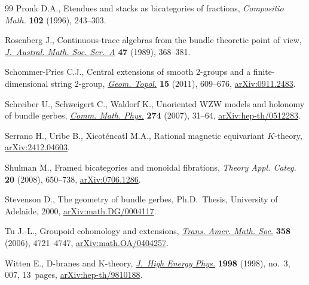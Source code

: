 \documentclass[pdftex]{sigma}
\numberwithin{equation}{section}
\begin{document}
\begin{thebibliography}{99}
Pronk D.A., Etendues and stacks as bicategories of fractions,
 \textit{Compositio Math.} \textbf{102} (1996), 243--303.

Rosenberg J., Continuous-trace algebras from the bundle theoretic point of
 view, \href{https://doi.org/10.1017/S1446788700033097}{\textit{J.~Austral.
 Math. Soc. Ser.~A}} \textbf{47} (1989), 368--381.

Schommer-Pries C.J., Central extensions of smooth 2-groups and a
 finite-dimensional string 2-group,
 \href{https://doi.org/10.2140/gt.2011.15.609}{\textit{Geom. Topol.}}
 \textbf{15} (2011), 609--676,
 \href{http://arxiv.org/abs/0911.2483}{arXiv:0911.2483}.

Schreiber U., Schweigert C., Waldorf K., Unoriented {WZW} models and holonomy
 of bundle gerbes,
 \href{https://doi.org/10.1007/s00220-007-0271-x}{\textit{Comm. Math. Phys.}}
 \textbf{274} (2007), 31--64,
 \href{http://arxiv.org/abs/hep-th/0512283}{arXiv:hep-th/0512283}.

Serrano H., Uribe B., Xicot\'encatl M.A., Rational magnetic equivariant
 {$K$}-theory, \href{http://arxiv.org/abs/2412.04603}{arXiv:2412.04603}.

Shulman M., Framed bicategories and monoidal fibrations, \textit{Theory Appl.
 Categ.} \textbf{20} (2008), 650--738,
 \href{http://arxiv.org/abs/0706.1286}{arXiv:0706.1286}.

Stevenson D., The geometry of bundle gerbes, Ph.D.~Thesis, {U}niversity of
 {A}delaide, 2000,
 \href{http://arxiv.org/abs/math.DG/0004117}{arXiv:math.DG/0004117}.

Tu J.-L., Groupoid cohomology and extensions,
 \href{https://doi.org/10.1090/S0002-9947-06-03982-1}{\textit{Trans. Amer.
 Math. Soc.}} \textbf{358} (2006), 4721--4747,
 \href{http://arxiv.org/abs/math.OA/0404257}{arXiv:math.OA/0404257}.

Witten E., D-branes and K-theory,
 \href{https://doi.org/10.1088/1126-6708/2000/03/007}{\textit{J.~High Energy
 Phys.}} \textbf{1998} (1998), no.~3, 007, 13~pages,
 \href{http://arxiv.org/abs/hep-th/9810188}{arXiv:hep-th/9810188}.

\end{thebibliography}\LastPageEnding
\end{document}
